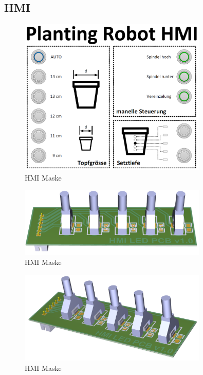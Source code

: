 \subsection{HMI} 
\label{sec:HMI}

\begin{figure}[H]
	\includegraphics[width=0.8\textwidth]{Illustrationen/6-Umsetzung/HMI_Maske.png}
	\caption{HMI Maske}
	\label{fig:HMI_Maske}
\end{figure}

\begin{figure}[H]
	\includegraphics[width=0.8\textwidth]{Illustrationen/6-Umsetzung/LED_PCB_3D.png}
	\caption{HMI Maske}
	\label{fig:HMI_Maske}
\end{figure}

\begin{figure}[H]
	\includegraphics[width=0.8\textwidth]{Illustrationen/6-Umsetzung/LED_PCB_3D_2.png}
	\caption{HMI Maske}
	\label{fig:HMI_Maske}
\end{figure}